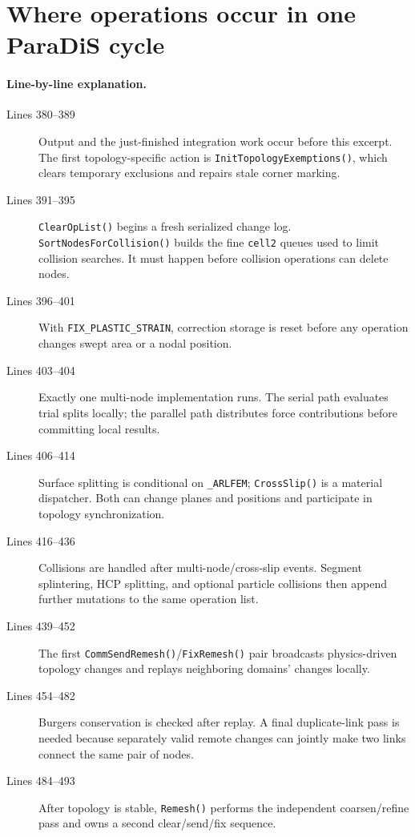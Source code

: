 \documentclass[11pt]{article}
\newcommand{\code}[1]{\texorpdfstring{\nolinkurl{#1}}{#1}}
\begin{document}
\section{Where operations occur in one ParaDiS cycle}



\paragraph{Line-by-line explanation.}
\begin{description}
\item[Lines 380--389] Output and the just-finished integration work occur
before this excerpt. The first topology-specific action is
\code{InitTopologyExemptions()}, which clears temporary exclusions and repairs
stale corner marking.
\item[Lines 391--395] \code{ClearOpList()} begins a fresh serialized change
log. \code{SortNodesForCollision()} builds the fine \code{cell2} queues used
to limit collision searches. It must happen before collision operations can
delete nodes.
\item[Lines 396--401] With \code{FIX_PLASTIC_STRAIN}, correction storage is
reset before any operation changes swept area or a nodal position.
\item[Lines 403--404] Exactly one multi-node implementation runs. The serial
path evaluates trial splits locally; the parallel path distributes force
contributions before committing local results.
\item[Lines 406--414] Surface splitting is conditional on \code{_ARLFEM};
\code{CrossSlip()} is a material dispatcher. Both can change planes and
positions and participate in topology synchronization.
\item[Lines 416--436] Collisions are handled after multi-node/cross-slip
events. Segment splintering, HCP splitting, and optional particle collisions
then append further mutations to the same operation list.
\item[Lines 439--452] The first \code{CommSendRemesh()}/\code{FixRemesh()}
pair broadcasts physics-driven topology changes and replays neighboring
domains' changes locally.
\item[Lines 454--482] Burgers conservation is checked after replay. A final
duplicate-link pass is needed because separately valid remote changes can
jointly make two links connect the same pair of nodes.
\item[Lines 484--493] After topology is stable, \code{Remesh()} performs the
independent coarsen/refine pass and owns a second clear/send/fix sequence.
\end{description}
\end{document}

